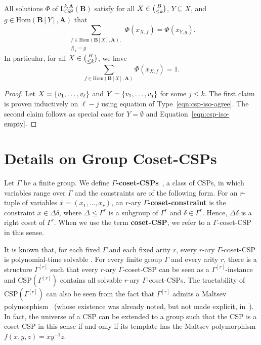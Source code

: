\documentclass[a4paper,english, thm-restate]{lipics-v2021}
\newcommand{\defining}[1]{\textbf{#1}}
\DeclarePairedDelimiter\set{\lbrace}{\rbrace}
\newcommand{\tup}[1]{\bar{#1}}
\newcommand{\StructA}{\mathbf{A}}
\newcommand{\StructB}{\mathbf{B}}
\newcommand{\CSP}[1]{\mathrm{CSP}(#1)}
\newcommand{\restrict}[2]{#1|_{#2}}
\newcommand{\Hom}[2]{\mathrm{Hom}(#1,#2)}
\newcommand{\leqs}{\mathsf{L}}
\newcommand{\cspiso}[3]{\leqs^{#1,#2}_{\mathsf{CSP}}(#3)}
\newcommand{\CosetGrpTmplt}[2]{#1^{[#2]}}
\begin{document}
	\begin{lemma}
		\label{lem:csp-iso-subsets}
		All solutions $\Phi$ of $\cspiso{k}{\StructA}{\StructB}$ satisfy for all $X \in \tbinom{B}{\leq k}$, $Y \subseteq X$, and $g \in \Hom{\StructB[Y]}{\StructA}$
		that 
		\[\sum_{\substack{f\in \Hom{\StructB[X]}{\StructA},\\\restrict{f}{Y} = g}} \Phi(x_{X,f}) = \Phi(x_{Y,g}). \]
		In particular, for all $X \in \tbinom{B}{\leq k}$, we have
		\[\sum_{f\in \Hom{\StructB[X]}{\StructA}} \Phi(x_{X,f}) = 1.\]
	\end{lemma}
	\begin{proof}
		Let $X = \set{v_1,\dots,v_\ell}$ and $Y= \set{v_1,\dots,v_j}$ for some $j \leq k$.
		The first claim is proven inductively on $\ell-j$ using equation of Type~\ref{eqn:csp-iso-agree}.
		The second claim follows as special case for $Y=\emptyset$
		and Equation~\ref{eqn:csp-iso-empty}.
	\end{proof}
	
	
	
	
	
	
	
	
	
	
	
	
	
	
	
	
	
	
	
	
	
	\section{Details on Group Coset-CSPs}
	\label{app:groupCSP}
	
	
	Let $\Gamma$ be a finite group.
	We define \defining{$\Gamma$-coset-CSPs}~\cite{BerkholzGrohe2015, feder1993monotone}, a class of CSPs, in which variables range over $\Gamma$ and the constraints are of the following form. 
	For an $r$-tuple of variables $\tup{x} = (x_1, \dots, x_r)$,
	an $r$-ary \defining{$\Gamma$-coset-constraint} is the constraint
	$\tup{x} \in \Delta\delta$, where $\Delta \leq \Gamma^r$ is a subgroup
	of $\Gamma^r$ and $\delta \in \Gamma^r$.
	Hence, $\Delta\delta$ is a right coset of $\Gamma^r$.
	When we use the term \defining{coset-CSP}, we refer to a $\Gamma$-coset-CSP in this sense.
	
	It is known that, for each fixed $\Gamma$ and each fixed arity $r$, every $r$-ary $\Gamma$-coset-CSP is polynomial-time solvable \cite{feder1993monotone}.
	For every finite group $\Gamma$ and every arity $r$, there is a structure $\CosetGrpTmplt{\Gamma}{r}$ such that every $r$-ary $\Gamma$-coset-CSP
	can be seen as a $\CosetGrpTmplt{\Gamma}{r}$-instance
	and $\CSP{\CosetGrpTmplt{\Gamma}{r}}$ contains all solvable $r$-ary $\Gamma$\nobreakdash-coset-CSPs.
	The tractability of $\CSP{\CosetGrpTmplt{\Gamma}{r}}$ can also be seen from the fact that $\CosetGrpTmplt{\Gamma}{r}$ admits a Maltsev polymorphism~\cite{BulatovDalmau2006}
	(whose existence was already noted, but not made explicit, in~\cite{BerkholzGrohe2015}).
	In fact, the universe of a CSP can be extended to a group such that
	the CSP is a coset-CSP in this sense if and only if its template has the Maltsev polymorphism $f(x,y,z) = xy^{-1}z$.
	
\end{document}
